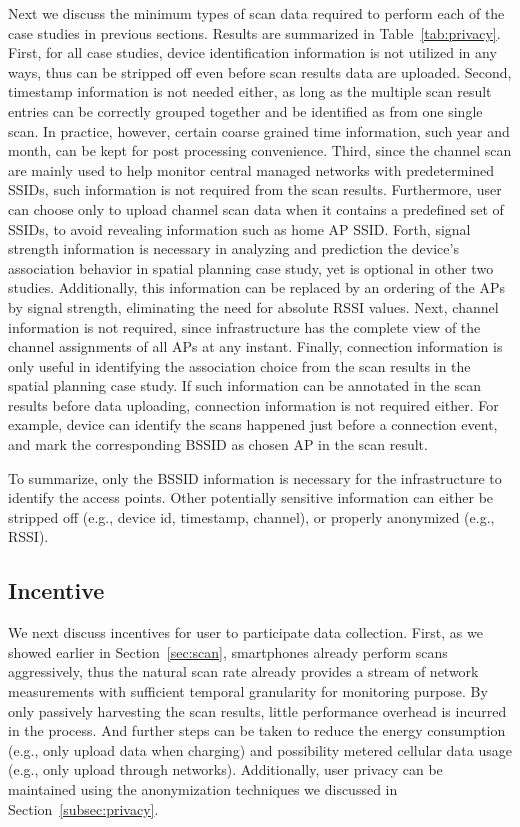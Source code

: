 Next we discuss the minimum types of scan data required to perform each of the
case studies in previous sections. Results are summarized in
Table~\ref{tab:privacy}. First, for all case studies, device identification
information is not utilized in any ways, thus can be stripped off even before
scan results data are uploaded. Second, timestamp information is not needed either, as
long as the multiple scan result entries can be correctly grouped together and
be identified as from one single scan. In
practice, however, certain coarse grained time information, such year and month, can be
kept for post processing convenience. Third, since the channel scan are mainly
used to help monitor central managed networks with predetermined SSIDs, such
information is not required from the scan results. Furthermore, user can choose
only to upload channel scan data when it contains a predefined set of SSIDs, to
avoid revealing information such as home AP SSID. Forth, signal strength
information is necessary in analyzing and prediction the device's association
behavior in spatial planning case study, yet is optional in other two studies.
Additionally, this information can be replaced by an ordering of the APs by signal
strength, eliminating the need for absolute RSSI values. Next, channel
information is not required, since infrastructure has the complete view
of the channel assignments of all APs at any instant. Finally, \wifi{}
connection information is only useful in identifying the association choice from
the scan results in the spatial planning case study. If such information can be
annotated in the scan results before data uploading, \wifi{} connection
information is not required either. For example, device can identify the scans
happened just before a \wifi{} connection event, and mark the corresponding
BSSID as chosen AP in the scan result.

To summarize, only the BSSID information is necessary for the infrastructure to
identify the access points. Other potentially sensitive information can either
be stripped off (e.g., device id, timestamp, channel), or properly anonymized
(e.g., RSSI).

\subsection{Incentive}
\label{subsec:incentive}

We next discuss incentives for user to participate data collection. First, as we
showed earlier in Section~\ref{sec:scan}, smartphones already perform \wifi{}
scans aggressively, thus the natural scan rate already provides a stream of
network measurements with sufficient temporal granularity for monitoring
purpose. By only passively harvesting the scan results, little performance
overhead is incurred in the process. And further steps can be taken to reduce
the energy consumption (e.g., only upload data when charging) and possibility
metered cellular data usage (e.g., only upload through \wifi{} networks).
Additionally, user privacy can be maintained using the anonymization techniques
we discussed in Section~\ref{subsec:privacy}.

